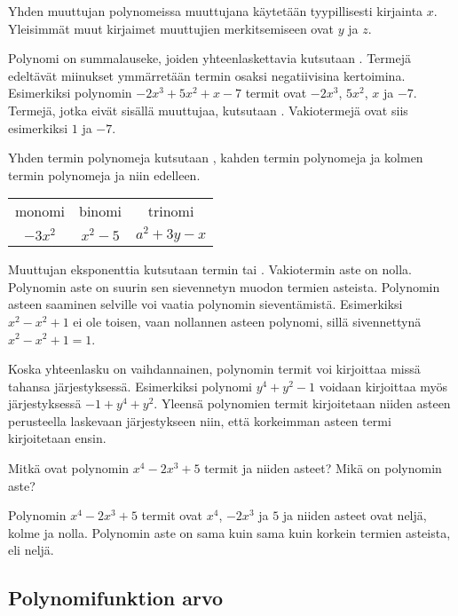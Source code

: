
Yhden muuttujan polynomeissa muuttujana käytetään tyypillisesti kirjainta $x$.
Yleisimmät muut kirjaimet muuttujien merkitsemiseen ovat $y$ ja $z$.

Polynomi on summalauseke, joiden yhteenlaskettavia kutsutaan .
Termejä edeltävät miinukset ymmärretään termin osaksi negatiivisina kertoimina.
Esimerkiksi polynomin $-2x^3+5x^2+x-7$ termit ovat $-2x^3$, $5x^2$, $x$ ja $-7$.
Termejä, jotka eivät sisällä muuttujaa, kutsutaan  .
Vakiotermejä ovat siis esimerkiksi $1$ ja $-7$.

Yhden termin polynomeja kutsutaan , kahden termin polynomeja  ja kolmen termin polynomeja  ja niin edelleen.
\begin{center}\begin{tabular}{ccc}
monomi	& binomi 	&	trinomi \\
$-3x^2$   &	$x^2-5$	& $a^2+3y-x$
 \end{tabular} \end{center}

Muuttujan eksponenttia kutsutaan termin  tai .
Vakiotermin aste on nolla. Polynomin aste on suurin sen sievennetyn muodon termien asteista.
Polynomin asteen saaminen selville voi vaatia polynomin sieventämistä.
Esimerkiksi $x^2-x^2+1$ ei ole toisen, vaan nollannen asteen polynomi, sillä sivennettynä
$x^2-x^2+1=1$.

Koska yhteenlasku on vaihdannainen, polynomin termit voi kirjoittaa missä tahansa järjestyksessä.
Esimerkiksi polynomi $y^4+y^2-1$ voidaan kirjoittaa myös järjestyksessä $-1+y^4+y^2$.
Yleensä polynomien termit kirjoitetaan niiden asteen perusteella laskevaan järjestykseen niin, että korkeimman asteen termi kirjoitetaan ensin.

\begin{esimerkki}
    Mitkä ovat polynomin $x^4-2x^3+5$ termit ja niiden asteet? Mikä on polynomin aste?
    \begin{esimvast}
        Polynomin $x^4-2x^3+5$ termit ovat $x^4$, $-2x^3$ ja $5$ ja niiden asteet ovat
        neljä, kolme ja nolla. Polynomin aste on sama kuin sama kuin
        korkein termien asteista, eli neljä.
    \end{esimvast}
\end{esimerkki}

\subsection*{Polynomifunktion arvo}


